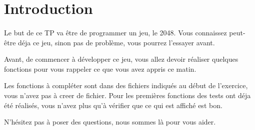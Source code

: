 \section*{Introduction}
\paragraph{}
Le but de ce TP va être de programmer un jeu, le 2048. Vous connaissez peut-être déja ce jeu, sinon pas de problème, vous pourrez l'essayer avant. 

Avant, de commencer à développer ce jeu, vous allez devoir réaliser quelques fonctions pour vous rappeler ce que vous avez appris ce matin.

Les fonctions à compléter sont dans des fichiers indiqués au début de l'exercice, vous n'avez pas à creer de fichier.
Pour les premières fonctions des tests ont déja été réalisés, vous n'avez plus qu'à vérifier que ce qui est affiché est bon.

N'hésitez pas à poser des questions, nous sommes là pour vous aider.
